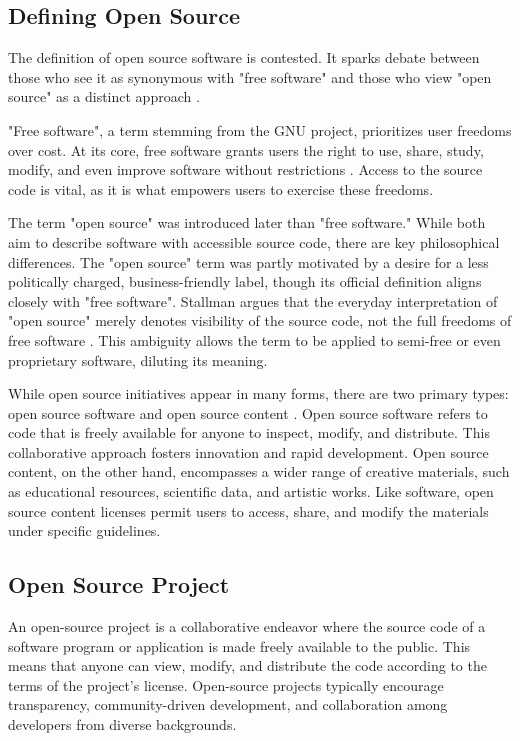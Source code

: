 \subsection{Defining Open Source}
The definition of open source software is contested. It sparks debate between those who see it as synonymous with "free software" and those who view "open source" as a distinct approach \cite{FuggettaAlfonso2003Osse}.

"Free software", a term stemming from the GNU project, prioritizes user freedoms over cost. At its core, free software grants users the right to use, share, study, modify, and even improve software without restrictions \cite{Whatisfreesoftware}.  Access to the source code is vital, as it is what empowers users to exercise these freedoms. 

The term "open source" was introduced later than "free software." While both aim to describe software with accessible source code, there are key philosophical differences. The "open source" term was partly motivated by a desire for a less politically charged, business-friendly label, though its official definition aligns closely with "free software". Stallman argues that the everyday interpretation of "open source" merely denotes visibility of the source code, not the full freedoms of free software \cite{StallmanWhyOpenSource}. This ambiguity allows the term to be applied to semi-free or even proprietary software, diluting its meaning.


While open source initiatives appear in many forms, there are two primary types: open source software and open source content \cite{OregShaul2008Emfc}. Open source software refers to code that is freely available for anyone to inspect, modify, and distribute. This collaborative approach fosters innovation and rapid development. Open source content, on the other hand, encompasses a wider range of creative materials, such as educational resources, scientific data, and artistic works. Like software, open source content licenses permit users to access, share, and modify the materials under specific guidelines.

\subsection{Open Source Project}
An open-source project is a collaborative endeavor where the source code of a software program or application is made freely available to the public. This means that anyone can view, modify, and distribute the code according to the terms of the project's license. Open-source projects typically encourage transparency, community-driven development, and collaboration among developers from diverse backgrounds. 


